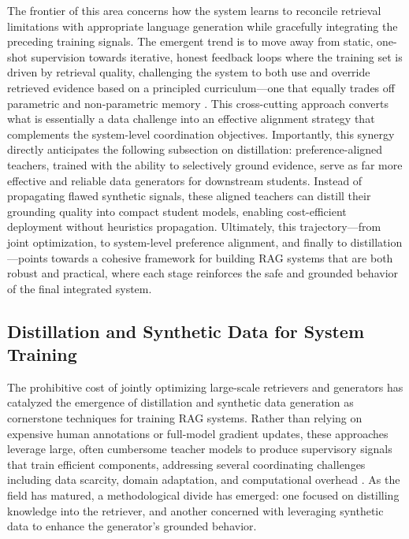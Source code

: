 \documentclass[11pt,a4paper]{article}
\begin{document}
The frontier of this area concerns how the system learns to reconcile retrieval limitations with appropriate language generation while gracefully integrating the preceding training signals. The emergent trend is to move away from static, one-shot supervision towards iterative, honest feedback loops where the training set is driven by retrieval quality, challenging the system to both use and override retrieved evidence based on a principled curriculum---one that equally trades off parametric and non-parametric memory \cite{arxiv:2005.11401v4}. This cross-cutting approach converts what is essentially a data challenge into an effective alignment strategy that complements the system-level coordination objectives. Importantly, this synergy directly anticipates the following subsection on distillation: preference-aligned teachers, trained with the ability to selectively ground evidence, serve as far more effective and reliable data generators for downstream students. Instead of propagating flawed synthetic signals, these aligned teachers can distill their grounding quality into compact student models, enabling cost-efficient deployment without heuristics propagation. Ultimately, this trajectory---from joint optimization, to system-level preference alignment, and finally to distillation---points towards a cohesive framework for building RAG systems that are both robust and practical, where each stage reinforces the safe and grounded behavior of the final integrated system.


\subsection{Distillation and Synthetic Data for System Training}


The prohibitive cost of jointly optimizing large-scale retrievers and generators has catalyzed the emergence of distillation and synthetic data generation as cornerstone techniques for training RAG systems. Rather than relying on expensive human annotations or full-model gradient updates, these approaches leverage large, often cumbersome teacher models to produce supervisory signals that train efficient components, addressing several coordinating challenges including data scarcity, domain adaptation, and computational overhead \cite{arxiv:2405.07437v2,arxiv:2404.10981v1}. As the field has matured, a methodological divide has emerged: one focused on distilling knowledge into the retriever, and another concerned with leveraging synthetic data to enhance the generator's grounded behavior.
\end{document}
